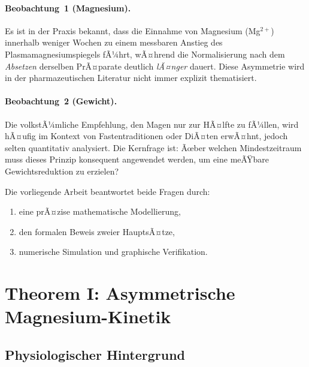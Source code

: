 ﻿\documentclass[12pt,a4paper]{article}
\theoremstyle{plain}
\theoremstyle{definition}
\theoremstyle{remark}
\begin{document}
\paragraph{Beobachtung~1 (Magnesium).}
Es ist in der Praxis bekannt, dass die Einnahme von Magnesium
(Mg$^{2+}$) innerhalb weniger Wochen zu einem messbaren Anstieg des
Plasmamagnesiumspiegels fÃ¼hrt, wÃ¤hrend die Normalisierung nach dem
\emph{Absetzen} derselben PrÃ¤parate deutlich \emph{lÃ¤nger} dauert. Diese
Asymmetrie wird in der pharmazeutischen Literatur nicht immer explizit
thematisiert.

\paragraph{Beobachtung~2 (Gewicht).}
Die volkstÃ¼mliche Empfehlung, den Magen nur zur HÃ¤lfte zu fÃ¼llen, wird
hÃ¤ufig im Kontext von Fastentraditionen oder DiÃ¤ten erwÃ¤hnt, jedoch selten
quantitativ analysiert. Die Kernfrage ist: Ãœber welchen Mindestzeitraum muss
dieses Prinzip konsequent angewendet werden, um eine meÃŸbare
Gewichtsreduktion zu erzielen?

Die vorliegende Arbeit beantwortet beide Fragen durch:
\begin{enumerate}[label=(\roman*)]
  \item eine prÃ¤zise mathematische Modellierung,
  \item den formalen Beweis zweier HauptsÃ¤tze,
  \item numerische Simulation und graphische Verifikation.
\end{enumerate}

\section{Theorem I: Asymmetrische Magnesium-Kinetik}
\label{sec:mg}

\subsection{Physiologischer Hintergrund}
\end{document}
